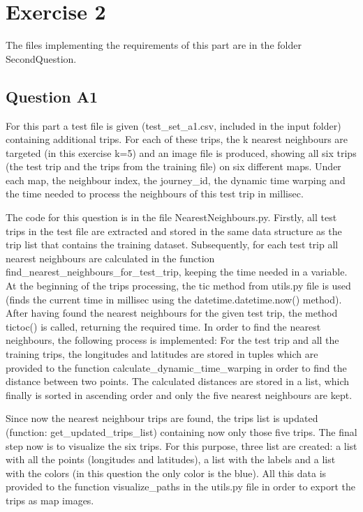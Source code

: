 \documentclass[12pt]{article}
\begin{document}
	\section{Exercise 2}
	The files implementing the requirements of this part are in the folder SecondQuestion.
	
	\subsection{Question A1}
	For this part a test file is given (test\_set\_a1.csv, included in the input folder) containing additional trips. For each of these trips, the k nearest neighbours are targeted (in this exercise k=5) and an image file is produced, showing all six trips (the test trip and the trips from the training file) on six different maps. Under each map, the neighbour index, the journey\_id, the dynamic time warping and the time needed to process the neighbours of this test trip in millisec.
	
	The code for this question is in the file NearestNeighbours.py. Firstly, all test trips in the test file are extracted and stored in the same data structure as the trip list that contains the training dataset. Subsequently, for each test trip all nearest neighbours are calculated in the function find\_nearest\_neighbours\_for\_test\_trip, keeping the time needed in a variable. At the beginning of the trips processing, the tic method from utils.py file is used (finds the current time in millisec using the datetime.datetime.now() method). After having found the nearest neighbours for the given test trip, the method tictoc() is called, returning the required time. In order to find the nearest neighbours, the following process is implemented: For the test trip and all the training trips, the longitudes and latitudes are stored in tuples which are provided to the function calculate\_dynamic\_time\_warping in order to find the distance between two points. The calculated distances are stored in a list, which finally is sorted in ascending order and only the five nearest neighbours are kept.
	
	Since now the nearest neighbour trips are found, the trips list is updated (function: get\_updated\_trips\_list) containing now only those five trips. The final step now is to visualize the six trips. For this purpose, three list are created: a list with all the points (longitudes and latitudes), a list with the labels and a list with the colors (in this question the only color is the blue). All this data is provided to the function visualize\_paths in the utils.py file in order to export the trips as map images.
	
\end{document}
